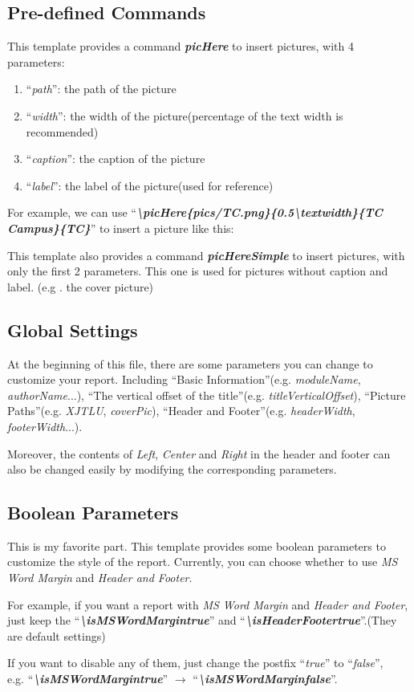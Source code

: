 \documentclass{article}
\begin{document}
\subsection{Pre-defined Commands}
\noindent This template provides a command \textit{\textbf{picHere}} to insert pictures, with 4 parameters:
\begin{enumerate}
    \item ``\textit{path}'': the path of the picture
    \item ``\textit{width}'': the width of the picture(percentage of the text width is recommended)
    \item ``\textit{caption}'': the caption of the picture
    \item ``\textit{label}'': the label of the picture(used for reference)
\end{enumerate}

\noindent For example, we can use ``\textit{\textbf{\textbackslash picHere\{pics/TC.png\}\{0.5\textbackslash textwidth\}\{TC Campus\}\{TC\}}}'' to insert a picture like this:

This template also provides a command \textit{\textbf{picHereSimple}} to insert pictures, 
with only the first 2 parameters. 
This one is used for pictures without caption and label. (e.g . the cover picture)

\subsection{Global Settings}
At the beginning of this file, there are some parameters you can change to customize your report. 
Including ``Basic Information''(e.g. \textit{moduleName}, \textit{authorName}...), 
``The vertical offset of the title''(e.g. \textit{titleVerticalOffset}), ``Picture Paths''(e.g. \textit{XJTLU}, \textit{coverPic}),
``Header and Footer''(e.g. \textit{headerWidth}, \textit{footerWidth}...).\par
Moreover, the contents of \textit{Left}, \textit{Center} and \textit{Right} in the header and footer can also be changed easily by modifying the corresponding parameters.

\subsection{Boolean Parameters}
This is my favorite part. This template provides some boolean parameters to customize the style of the report.
Currently, you can choose whether to use \textit{MS Word Margin} and \textit{Header and Footer}.\par
For example, if you want a report with \textit{MS Word Margin} and \textit{Header and Footer}, 
just keep the ``\textit{\textbf{\textbackslash isMSWordMargintrue}}'' and ``\textit{\textbf{\textbackslash isHeaderFootertrue}}''.(They are default settings)\par
If you want to disable any of them, just change the postfix ``\textit{true}'' to ``\textit{false}'', \\ 
e.g. ``\textit{\textbf{\textbackslash isMSWordMargintrue}}'' \(\rightarrow\) ``\textit{\textbf{\textbackslash isMSWordMarginfalse}}''.
\end{document}
